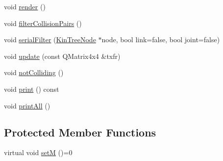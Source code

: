 \begin{DoxyCompactItemize}
\item 
void \hyperlink{class_robot_model_1_1_kin_tree_node_a85f4364980f9144471b9d92e175c539e}{render} ()
\item 
void \hyperlink{class_robot_model_1_1_kin_tree_node_a51113339b5ffc471c058218f1294d73a}{filterCollisionPairs} ()
\item 
void \hyperlink{class_robot_model_1_1_kin_tree_node_adc5e295285315ab45b65c1dceeee1770}{serialFilter} (\hyperlink{class_robot_model_1_1_kin_tree_node}{KinTreeNode} $\ast$node, bool link=false, bool joint=false)
\item 
void \hyperlink{class_robot_model_1_1_kin_tree_node_a7edaa7f382637f6a15c3af68f4dfc7ab}{update} (const QMatrix4x4 \&txfr)
\item 
void \hyperlink{class_robot_model_1_1_kin_tree_node_ae5d72a496f39cad4e266c11d75d4731c}{notColliding} ()
\item 
void \hyperlink{class_robot_model_1_1_kin_tree_node_a788349199227101ec9e5a478842a1959}{print} () const 
\item 
void \hyperlink{class_robot_model_1_1_kin_tree_node_af682a96a09f754e0fb82066560538241}{printAll} ()
\end{DoxyCompactItemize}
\subsection*{Protected Member Functions}
\begin{DoxyCompactItemize}
\item 
virtual void \hyperlink{class_robot_model_1_1_kin_tree_node_a47574c65af53990455540547d8d00e9f}{setM} ()=0
\end{DoxyCompactItemize}
